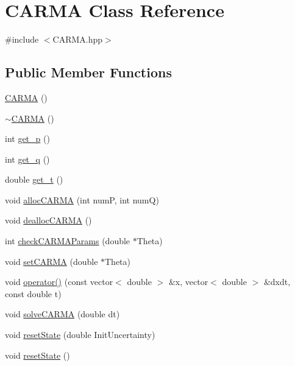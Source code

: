 \hypertarget{class_c_a_r_m_a}{\section{C\-A\-R\-M\-A Class Reference}
\label{class_c_a_r_m_a}
}


{\ttfamily \#include $<$C\-A\-R\-M\-A.\-hpp$>$}

\subsection*{Public Member Functions}
\begin{DoxyCompactItemize}
\item 
\hyperlink{class_c_a_r_m_a_a8871e02b301b503a987c03afc15c573c}{C\-A\-R\-M\-A} ()
\item 
\hyperlink{class_c_a_r_m_a_a19f2c3c41d81428c5f77a71f983dcc0b}{$\sim$\-C\-A\-R\-M\-A} ()
\item 
int \hyperlink{class_c_a_r_m_a_af758356c8aec7ea57d4edbd4c430c780}{get\-\_\-p} ()
\item 
int \hyperlink{class_c_a_r_m_a_aca44011b5238545f728d61d1cbbb72c2}{get\-\_\-q} ()
\item 
double \hyperlink{class_c_a_r_m_a_a96b654c437e7d9528d44c7dbc4bc9657}{get\-\_\-t} ()
\item 
void \hyperlink{class_c_a_r_m_a_a6f96e596ba4a66b3f9eb7234292ad1d0}{alloc\-C\-A\-R\-M\-A} (int num\-P, int num\-Q)
\item 
void \hyperlink{class_c_a_r_m_a_af850b7e2ba5af3ae028aacfc0891b830}{dealloc\-C\-A\-R\-M\-A} ()
\item 
int \hyperlink{class_c_a_r_m_a_ad606acee248d451679b522172d7b9ac4}{check\-C\-A\-R\-M\-A\-Params} (double $\ast$Theta)
\item 
void \hyperlink{class_c_a_r_m_a_a70e6ec6090f629d43e9ed810346c766e}{set\-C\-A\-R\-M\-A} (double $\ast$Theta)
\item 
void \hyperlink{class_c_a_r_m_a_a1b85f710457cdf67a6b716a149456bca}{operator()} (const vector$<$ double $>$ \&x, vector$<$ double $>$ \&dxdt, const double t)
\item 
void \hyperlink{class_c_a_r_m_a_ab40779c2e688ef40afe4c925a777ebc7}{solve\-C\-A\-R\-M\-A} (double dt)
\item 
void \hyperlink{class_c_a_r_m_a_a8748732c23bc65486b9df8f25a905cf9}{reset\-State} (double Init\-Uncertainty)
\item 
void \hyperlink{class_c_a_r_m_a_a44b60949dc1cbcccb24873a117faa5ac}{reset\-State} ()
\item 

\end{DoxyCompactItemize}
